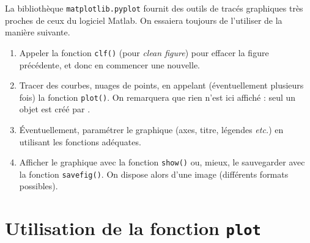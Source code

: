 La bibliothèque \texttt{matplotlib.pyplot} fournit des outils de tracés graphiques très proches de ceux du logiciel Matlab. 
On essaiera toujours de l'utiliser de la manière suivante. 
\begin{enumerate}
  \item Appeler la fonction \texttt{clf()} (pour \emph{clean figure}) pour effacer la figure précédente, et donc en commencer une nouvelle. 
  \item Tracer des courbes, nuages de points, en appelant (éventuellement plusieurs fois) la fonction \texttt{plot()}. On remarquera que rien n'est ici affiché : seul un objet est créé par \python. 
  \item Éventuellement, paramétrer le graphique (axes, titre, légendes \emph{etc.}) en utilisant les fonctions adéquates. 
  \item Afficher le graphique avec la fonction \texttt{show()} ou, mieux, le sauvegarder avec la fonction \texttt{savefig()}. On dispose alors d'une image (différents formats possibles). 
\end{enumerate}

\section{Utilisation de la fonction \texttt{plot}}

